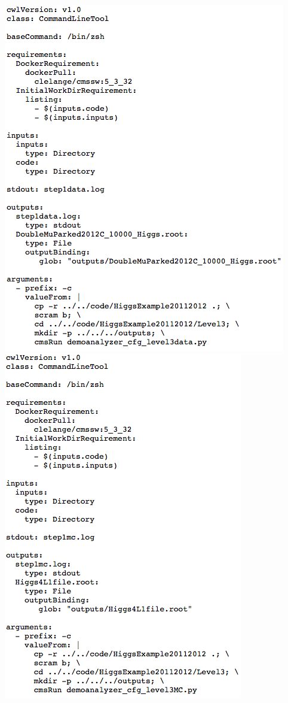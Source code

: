 \documentclass[letter]{article}
\begin{document}
\includegraphics[scale=0.45]{step1data} 
\includegraphics[scale=0.45]{step1mc} \\ \\
\end{document}
